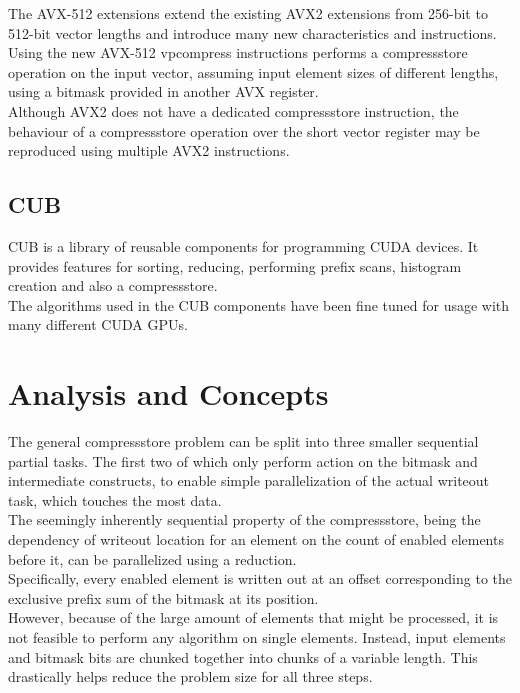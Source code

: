 \documentclass{tudscrreprt}
\begin{document}
			The AVX-512 extensions extend the existing AVX2 extensions from 256-bit to 512-bit vector lengths and introduce many new characteristics and instructions. Using the new AVX-512 vpcompress instructions performs a compressstore operation on the input vector, assuming input element sizes of different lengths, using a bitmask provided in another AVX register. \\
			
			Although AVX2 does not have a dedicated compressstore instruction, the behaviour of a compressstore operation over the short vector register may be reproduced using multiple AVX2 instructions. \\
		
		\subsection{CUB}
			CUB is a library of reusable components for programming CUDA devices. It provides features for sorting, reducing, performing prefix scans, histogram creation and also a compressstore. \\
			The algorithms used in the CUB components have been fine tuned for usage with many different CUDA GPUs. \\
		
	\section{Analysis and Concepts}
		The general compressstore problem can be split into three smaller sequential partial tasks. The first two of which only perform action on the bitmask and intermediate constructs, to enable simple parallelization of the actual writeout task, which touches the most data. \\
		
		The seemingly inherently sequential property of the compressstore, being the dependency of writeout location for an element on the count of enabled elements before it, can be parallelized using a reduction. \\
		Specifically, every enabled element is written out at an offset corresponding to the exclusive prefix sum of the bitmask at its position. \\
		
		However, because of the large amount of elements that might be processed, it is not feasible to perform any algorithm on single elements. Instead, input elements and bitmask bits are chunked together into chunks of a variable length. This drastically helps reduce the problem size for all three steps. \\
		
\end{document}
